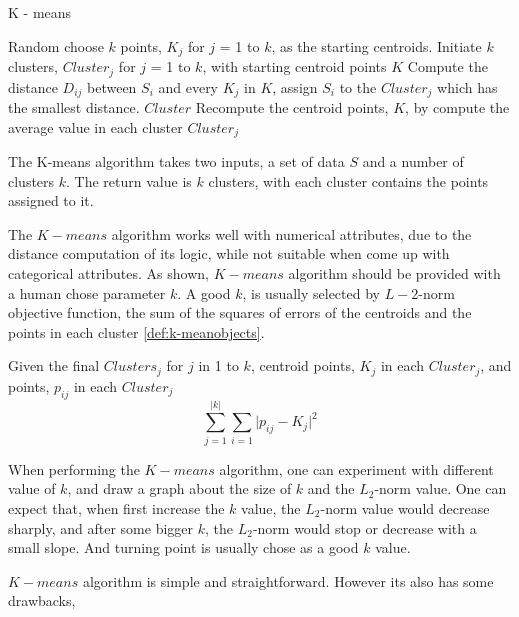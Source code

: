 \documentclass[utf8,english]{gradu3}
\begin{document}
\algrenewcommand\Return{\State \algorithmicreturn{} }%
\begin{algorithm}[h]
	\caption{K - means}
	\label{alg:kmeans}
	\begin{algorithmic}[1]
		\State Random choose $k$ points, $K_j$ for $j$ = 1 to $k$,  as the starting centroids.
		\State Initiate $k$ clusters, $Cluster_j$ for $j$ = 1 to $k$, with starting centroid points $K$
			    \State Compute the distance $D_{ij}$ between $S_i$ and every $K_j$ in $K$, assign $S_i$ to the $Cluster_j$ which has the smallest distance.
			\EndFor
				\Return $Cluster$
			\EndIf
			\State Recompute the centroid points, $K$, by compute the average value in each cluster $Cluster_j$
		\EndWhile
		\EndProcedure
		
		The K-means algorithm takes two inputs, a set of data $S$ and a number of clusters $k$. The return value is $k$ clusters, with each cluster contains the points assigned to it.
	\end{algorithmic}
\end{algorithm}

The $K-means$ algorithm works well with numerical attributes, due to the distance computation of its logic, while not suitable when come up with categorical attributes. As shown, $K-means$ algorithm should be provided with a human chose parameter $k$. A good $k$, is usually selected by $L-2$-norm objective function, the sum of the squares of errors of the centroids and the points in each cluster \ref{def:k-meanobjects}.

\begin{definition}
	\label{def:k-meanobjects}
	Given the final $Clusters_j$ for $j$ in 1 to $k$, centroid points, $K_j$ in each $Cluster_j$, and points, $p_{ij}$ in each $Cluster_j$
	\[
		\sum\limits_{j=1}^{\lvert  k\rvert } \sum\limits_{i=1} \lvert p_{ij} - K_j \lvert ^2
	\]
\end{definition}

When performing the $K-means$ algorithm, one can experiment with different value of $k$, and draw a graph about the size of $k$ and the $L_2$-norm value. One can expect that, when first increase the $k$ value, the $L_2$-norm value would decrease sharply, and after some bigger $k$, the $L_2$-norm would stop or decrease with a small slope. And turning point is usually chose as a good $k$ value.

$K-means$ algorithm is simple and straightforward. However its also has some drawbacks,
\end{document}
